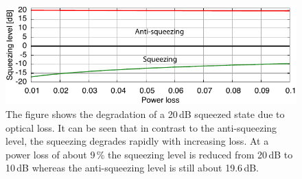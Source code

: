 \begin{figure}[ht]
\centering
\includegraphics[scale = 1]{./Sec_Optics/SQZ-20dB-losschartAI-ill.pdf}
\caption[Degradation of a 20\,dB squeezed state due to optical loss]{The figure shows the degradation of a 20\,dB squeezed state due to optical loss. It can be seen that in contrast to the anti-squeezing level, the squeezing degrades rapidly with increasing loss. At a power loss of about 9\,\% the squeezing level is reduced from 20\,dB to 10\,dB whereas the anti-squeezing level is still about 19.6\,dB.} \label{fig:sqz-vs-loss-chart}
\end{figure}


